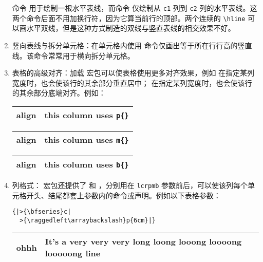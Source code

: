 \begin{enumerate}
命令 \boxforcmd{\\hline} 用于绘制一根水平表线，而命令  仅绘制从 \verb|c1| 列到 \verb|c2| 列的水平表线。这两个命令后面不用加换行符，因为它算当前行的顶部。两个连续的 \verb|\hline| 可以画水平双线，但是这种方式制造的双线与竖直表线的相交效果不好。

\item 竖向表线与拆分单元格：在单元格内使用 \boxforcmd{\\vline} 命令仅画出等于所在行行高的竖直线。该命令常常用于横向拆分单元格。

\item 表格的高级对齐：加载  宏包可以使表格使用更多对齐效果，例如  在指定某列宽度时，也会使该行的其余部分垂直居中； 在指定某列宽度时，也会使该行的其余部分底端对齐。例如：

\begin{tcolorbox}[colback=white]
    \centering
    \begin{tabular}{|c|p{5.6em}|}
        \hline
            align & this column uses \verb|p{}|\\
        \hline
    \end{tabular}
    \begin{tabular}{|c|m{5.6em}|}
        \hline
            align & this column uses \verb|m{}|\\
        \hline
    \end{tabular}
    \begin{tabular}{|c|b{5.6em}|}
        \hline
            align & this column uses \verb|b{}|\\
        \hline
    \end{tabular}
\end{tcolorbox}

\item 列格式： 宏包还提供了 \boxforcmd{>{}} 和 \boxforcmd{<{}} ，分别用在 \verb|lcrpmb| 参数前后，可以使该列每个单元格开头、结尾都套上参数内的命令或声明。例如以下表格参数：

\begin{tcolorbox}[sidebyside]
\begin{lstlisting}
{|>{\bfseries}c|
  >{\raggedleft\arraybackslash}p{6cm}|}
\end{lstlisting} 

\tcblower

\begin{center}
    \begin{tabular}{|>{\bfseries}c|>{\raggedleft\arraybackslash}p{6cm}|}
        \hline
        ohhh & It's a very very very long loong looong loooong looooong line\\
        \hline
    \end{tabular}
\end{center}
\end{tcolorbox}


\end{enumerate}
